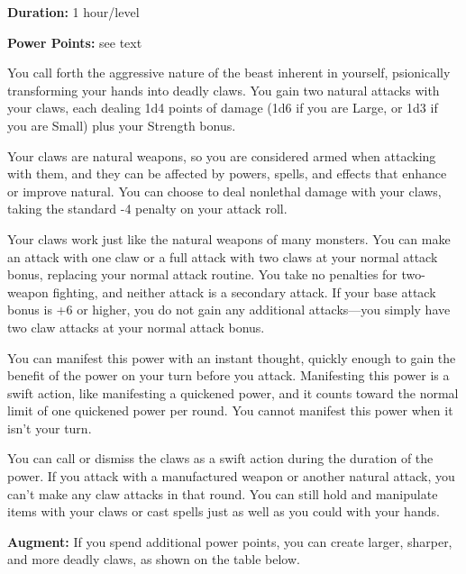 \documentclass{article}
\begin{document}
\textbf{Duration:} 1 hour/level

\textbf{Power Points:} see text

You call forth the aggressive nature of the beast inherent in yourself, psionically 
transforming your hands into deadly claws. You gain two natural attacks with your 
claws, each dealing 1d4 points of damage (1d6 if you are Large, or 1d3 if you are 
Small) plus your Strength bonus.

Your claws are natural weapons, so you are considered armed when attacking with 
them, and they can be affected by powers, spells, and effects that enhance or improve 
natural. You can choose to deal nonlethal damage with your claws, taking the standard 
-4 penalty on your attack roll.

Your claws work just like the natural weapons of many monsters. You can make an 
attack with one claw or a full attack with two claws at your normal attack bonus, 
replacing your normal attack routine. You take no penalties for two-weapon fighting, 
and neither attack is a secondary attack. If your base attack bonus is +6 or higher, 
you do not gain any additional attacks---you simply have two claw attacks at your 
normal attack bonus.

You can manifest this power with an instant thought, quickly enough to gain the 
benefit of the power on your turn before you attack. Manifesting this power is 
a swift action, like manifesting a quickened power, and it counts toward the normal 
limit of one quickened power per round. You cannot manifest this power when it 
isn't your turn.

You can call or dismiss the claws as a swift action during the duration of the 
power. If you attack with a manufactured weapon or another natural attack, you 
can't make any claw attacks in that round. You can still hold and manipulate items 
with your claws or cast spells just as well as you could with your hands.

\textbf{Augment:} If you spend additional power points, you can create larger, 
sharper, and more deadly claws, as shown on the table below.
\end{document}
